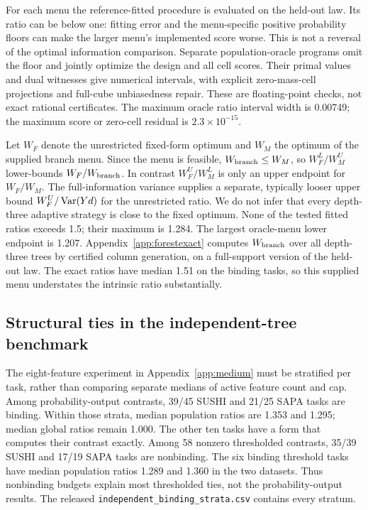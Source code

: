 For each menu the reference-fitted procedure is evaluated on the held-out
law. Its ratio can be below one: fitting error and the menu-specific
positive probability floors can make the larger menu's implemented score
worse. This is not a reversal of the optimal information comparison.
Separate population-oracle programs omit the floor and jointly optimize
the design and all cell scores. Their primal values and dual witnesses
give numerical intervals, with explicit zero-mass-cell projections and
full-cube unbiasedness repair. These are floating-point checks, not exact
rational certificates. The maximum oracle ratio interval width is 0.00749;
the maximum score or zero-cell residual is $2.3\times10^{-15}$.

Let $W_F$ denote the unrestricted fixed-form optimum and $W_M$ the optimum
of the supplied branch menu. Since the menu is feasible,
$W_{\rm branch}\le W_M$, so $W_F^L/W_M^U$ lower-bounds
$W_F/W_{\rm branch}$. In contrast $W_F^U/W_M^L$ is only an upper endpoint
for $W_F/W_M$. The full-information variance supplies a separate, typically
looser upper bound $W_F^U/\operatorname{Var}(Yd)$ for the unrestricted ratio. We do not
infer that every depth-three adaptive strategy is close to the fixed
optimum. None of the tested fitted ratios exceeds 1.5; their maximum is
1.284. The largest oracle-menu lower endpoint is 1.207.
Appendix~\ref{app:forestexact} computes $W_{\rm branch}$ over all
depth-three trees by certified column generation, on a full-support version
of the held-out law. The exact ratios have median 1.51 on the binding tasks,
so this supplied menu understates the intrinsic ratio substantially.



\subsection{Structural ties in the independent-tree benchmark}\label{app:binding}
The eight-feature experiment in Appendix~\ref{app:medium} must be stratified
per task, rather than comparing separate medians of active feature count
and cap. Among probability-output contrasts, 39/45 SUSHI and 21/25 SAPA
tasks are binding. Within those strata, median population ratios are
1.353 and 1.295; median global ratios remain 1.000. The other ten tasks
have a form that computes their contrast exactly. Among 58 nonzero
thresholded contrasts, 35/39 SUSHI and 17/19 SAPA tasks are nonbinding.
The six binding threshold tasks have median population ratios 1.289 and
1.360 in the two datasets. Thus nonbinding budgets explain most
thresholded ties, not the probability-output results. The released
\texttt{independent\_binding\_strata.csv} contains every stratum.

